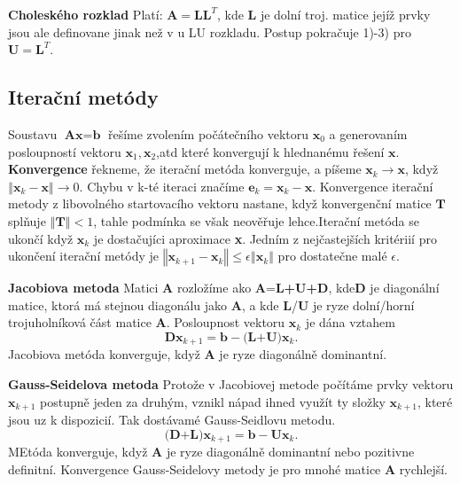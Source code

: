 \textbf{Choleského rozklad}
Platí: $\textbf{A}=\textbf{L}\textbf{L}^{T}$, kde \textbf{L} je dolní troj. matice jejíž prvky jsou ale definovane jinak než v u LU rozkladu. Postup pokračuje 1)-3) pro $\textbf{U}=\textbf{L}^{T}.$
\newline
\subsection{Iterační metódy}
Soustavu $\textbf{Ax}=\textbf{b}$ řešíme zvolením počátečního vektoru $\textbf{x}_{0}$ a generovaním posloupností vektoru $\textbf{x}_{1},\textbf{x}_{2}$,atd které konvergují k hlednanému řešení $\textbf{x}$. 
\newline\textbf{Konvergence}
\newline
řekneme, že iterační metóda konverguje, a píšeme $\textbf{x}_{k} \rightarrow\textbf{x}$, když  $\left\Vert\textbf{x}_{k}-\textbf{x}\right\Vert\rightarrow 0$. Chybu v k-té iteraci značíme $\textbf{e}_{k}=\textbf{x}_{k}-\textbf{x}$. Konvergence iterační metody z libovolného startovacího vektoru nastane, když konvergenční matice $\textbf{T}$ splňuje $\left\Vert\textbf{T}\right\Vert<1$, tahle podmínka se však neověřuje lehce.\newline Iterační metóda se ukončí když $\textbf{x}_{k}$ je dostačujíci aproximace \textbf{x}. Jedním z nejčastejších kritériií pro ukončení iterační metódy je  $\left\Vert\textbf{x}_{k+1}-\textbf{x}_{k}\right\Vert\leq \epsilon\left\Vert\textbf{x}_{k}\right\Vert$ pro dostatečne malé $\epsilon$.

\textbf{Jacobiova metoda}
\newline Matici \textbf{A} rozložíme ako \textbf{A}=\textbf{L+U+D}, kde\textbf{D} je diagonální matice, ktorá má stejnou diagonálu jako \textbf{A}, a kde \textbf{L}/\textbf{U} je ryze dolní/horní trojuholníková část matice \textbf{A}. Posloupnost vektoru $\textbf{x}_{k}$ je dána vztahem $$\textbf{D}\textbf{x}_{k+1}=\textbf{b}-\textbf{(L+U)}\textbf{x}_{k}.$$ Jacobiova metóda konverguje, když \textbf{A} je ryze diagonálně dominantní.

\textbf{Gauss-Seidelova metoda}\newline
Protože v Jacobiovej metode počítáme prvky vektoru  $\textbf{x}_{k+1}$ postupně jeden za druhým, vznikl nápad ihned využít ty složky  $\textbf{x}_{k+1}$, které jsou uz k dispozicií. Tak dostávamé Gauss-Seidlovu metodu. $$\textbf{(D+L)}\textbf{x}_{k+1}=\textbf{b}-\textbf{U}\textbf{x}_{k}.$$ MEtóda konverguje, když \textbf{A} je ryze diagonálně dominantní nebo pozitivne definitní. 
\newline Konvergence Gauss-Seidelovy metody je pro mnohé matice \textbf{A} rychlejší.

